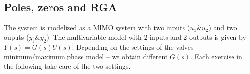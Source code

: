 \subsection{Poles, zeros and RGA}

The system is modelized as a MIMO system with two inputs ($u_1 \& u_2$) and two ouputs ($y_1 \& y_2$).
The multivariable model with $2$ inputs and $2$ outputs is given by $Y(s) = G(s)U(s)$.
Depending on the settings of the valves -- minimum/maximum phase model -- we obtain different $G(s)$.
Each exercise in the following take care of the two settings.


% 
% 
% 
% 
% 
